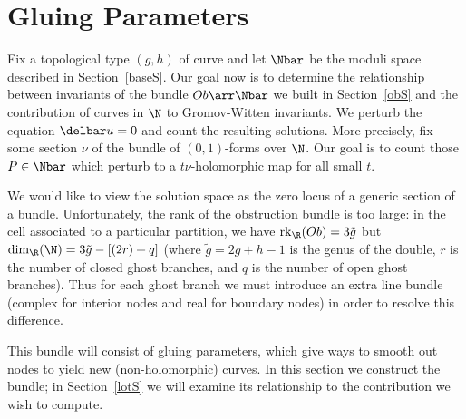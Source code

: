 \section{Gluing Parameters} \label{glueS}

Fix a topological type $(g,h)$ of curve and let $\Nbar$ be the moduli space described in Section~\ref{baseS}. 
Our goal now is to determine the relationship between invariants of the bundle $Ob \arr \Nbar$ we built in Section~\ref{obS} and the contribution of curves in $\N$ to Gromov-Witten invariants. We perturb the equation $\delbar u = 0$ and count the resulting solutions. More precisely, fix some section $\nu$ of the bundle of $(0,1)$-forms over $\N$. Our goal is to count those $P \in \Nbar$ which perturb to a $t\nu$-holomorphic map for all small $t$.

We would like to view the solution space as the zero locus of a generic section of a bundle. Unfortunately, the rank of the obstruction bundle is too large: in the cell associated to a particular partition, we have $\rk_\R(Ob)=3\tilde{g}$ but $\dim_\R(\N)=3\tilde{g}-[(2r)+q]$ (where $\tilde{g}=2g+h-1$ is the genus of the double, $r$ is the number of closed ghost branches, and $q$ is the number of open ghost branches). Thus for each ghost branch we must introduce an extra line bundle (complex for interior nodes and real for boundary nodes) in order to resolve this difference.

This bundle will consist of gluing parameters, which give ways to smooth out nodes to yield new (non-holomorphic) curves. In this section we construct the bundle; in Section~\ref{lotS} we will examine its relationship to the contribution we wish to compute.


